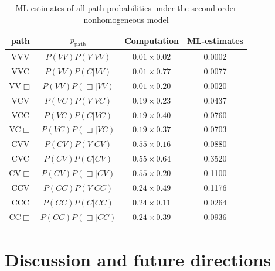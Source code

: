 \documentclass[11pt, a4paper]{article}
\numberwithin{equation}{section}
\theoremstyle{plain}
\theoremstyle{definition}
\begin{document}
\begin{table}[ht]
\centering
\caption{ML-estimates of all path probabilities under the second-order nonhomogeneous model}
\label{tab:path_probs_secondorder}
\begin{tabular}{c c c c}
\toprule
path & $p_{\text{path}}$ & Computation & ML-estimates \\
\midrule
VVV & $P(VV)P(V| VV)$ & $0.01 \times 0.02$ & 0.0002 \\ 
VVC & $P(VV)P(C|VV)$ & $0.01\times0.77$  & 0.0077 \\
VV$\mathcal\Box$ & $P(VV)P(\mathcal\Box|VV)$& $0.01\times0.20$ & 0.0020    \\
VCV & $P(VC)P(V|VC)$  & $0.19\times0.23$ & 0.0437  \\
VCC & $P(VC)P(C|VC)$  & $0.19\times0.40$ & 0.0760 \\
VC$\mathcal\Box$ & $P(VC)P(\mathcal\Box|VC)$ &$0.19\times0.37$ & 0.0703   \\
CVV & $P(CV)P(V|CV)$ & $0.55\times 0.16$  & 0.0880  \\
CVC & $P(CV)P(C|CV)$ & $0.55 \times 0.64$ & 0.3520 \\
CV$\mathcal\Box$ & $P(CV)P(\mathcal\Box|CV)$ & $0.55\times 0.20$ & 0.1100  \\
CCV & $P(CC)P(V|CC)$ & $0.24\times 0.49$  & 0.1176 \\
CCC & $P(CC)P(C|CC)$  & $0.24 \times 0.11$ &  0.0264\\
CC$\mathcal\Box$ & $P(CC)P(\mathcal\Box|CC)$ & $0.24 \times 0.39$ & 0.0936 \\
\bottomrule
\end{tabular}
\end{table}









\section{Discussion and future directions}
\label{sec:discussion}
\end{document}

